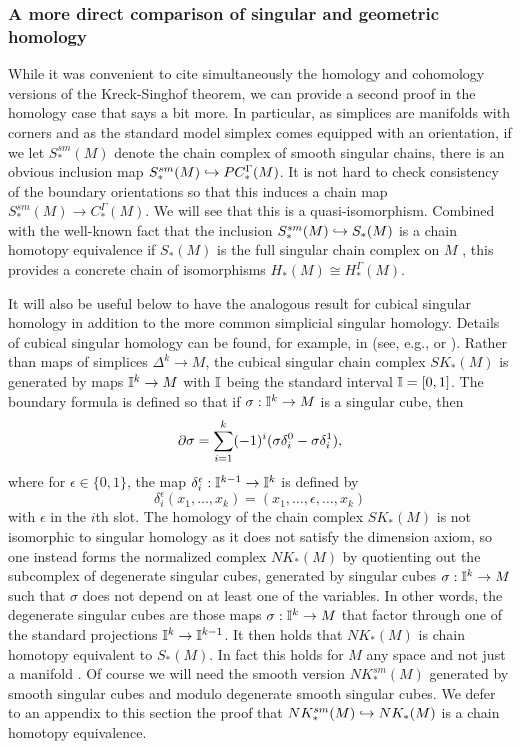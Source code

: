 \subsubsection{A more direct comparison of singular and geometric homology}

While it was convenient to cite simultaneously the homology and cohomology versions of the Kreck-Singhof theorem, we can provide a second proof in the homology case that says a bit more. In particular, as simplices are manifolds with corners and as the standard model simplex comes equipped with an orientation, if we let $S^{sm}_*(M)$ denote the chain complex of smooth singular chains, there is an obvious inclusion map $S^{sm}_*(M) \hookrightarrow PC_*^\Gamma(M)$. It is not hard to check consistency of the boundary orientations so that this induces a chain map $S^{sm}_*(M) \to C_*^\Gamma(M)$. We will see that this is a quasi-isomorphism. Combined with the well-known fact that the inclusion $S^{sm}_*(M) \hookrightarrow S_*(M)$ is a chain homotopy equivalence if $S_*(M)$ is the full singular chain complex on $M$ \cite[Theorem 18.7]{Lee13}, this provides a concrete chain of isomorphisms $H_*(M) \cong H_*^\Gamma(M)$.

It will also be useful below to have the analogous result for cubical singular homology in addition to the more common simplicial singular homology. Details of cubical singular homology can be found, for example, in (see, e.g., \cite{Mas91} or \cite[Section 8.3]{HW60}). Rather than maps of simplices $\Delta^k \to M$, the cubical singular chain complex $SK_*(M)$ is generated by maps $\mathbb{I}^k \to M$ with $\mathbb{I}$ being the standard interval $\mathbb{I} = [0,1]$. The boundary formula is defined so that if $\sigma: \mathbb{I}^k \to M$ is a singular cube, then
\begin{equation}\label{E: cube bd}
\partial \sigma = \sum_{i = 1}^k (-1)^i(\sigma \delta_i^0-\sigma \delta^1_i),
\end{equation}
where for $\epsilon\in\{0,1\}$, the map $\delta_i^\epsilon:\mathbb{I}^{k-1} \to \mathbb{I}^k$ is defined by
$$\delta_i^\epsilon(x_1,\ldots,x_k) = (x_1,\ldots,\epsilon,\ldots, x_k)$$
with $\epsilon$ in the $i$th slot. The homology of the chain complex $SK_*(M)$ is not isomorphic to singular homology as it does not satisfy the dimension axiom, so one instead forms the normalized complex $NK_*(M)$ by quotienting out the subcomplex of degenerate singular cubes, generated by singular cubes $\sigma:\mathbb{I}^k \to M$ such that $\sigma$ does not depend on at least one of the variables. In other words, the degenerate singular cubes are those maps $\sigma:\mathbb{I}^k \to M$ that factor through one of the standard projections $\mathbb{I}^k \to \mathbb{I}^{k-1}$. It then holds that $NK_*(M)$ is chain homotopy equivalent to $S_*(M)$. In fact this holds for $M$ any space and not just a manifold \cite[Theorem 8.4.7]{HW60}. Of course we will need the smooth version $NK^{sm}_*(M)$ generated by smooth singular cubes and modulo degenerate smooth singular cubes. We defer to an appendix to this section the proof that $NK^{sm}_*(M) \hookrightarrow NK_*(M)$ is a chain homotopy equivalence.




